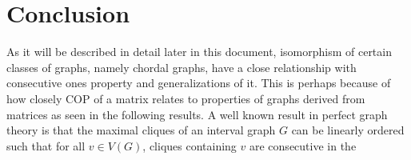 \documentclass[MS,synopsis]{iitmdiss}
\begin{document}






\section{Conclusion}
As it will be described in detail later in this document, isomorphism
of certain classes of graphs, namely chordal graphs, have a close
relationship with consecutive ones property and generalizations of it.
This is perhaps because of how closely COP of a matrix relates to
properties of graphs derived from matrices as seen in the following
results. %
A well known result in perfect graph theory is that the maximal
cliques of an interval graph $G$ can be linearly ordered such that for
all $v \in V(G)$, cliques containing $v$ are consecutive in the
\end{document}

